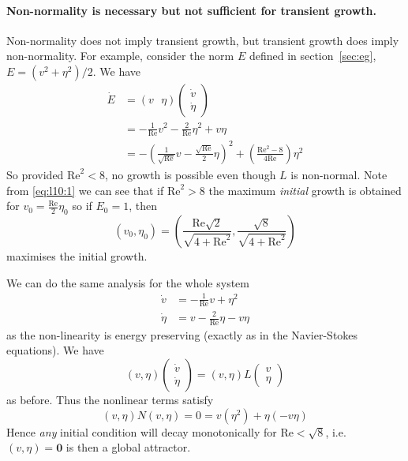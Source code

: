 \documentclass{jknotes}
\newcommand{\ReN}{\text{Re}}
\begin{document}
\paragraph{Non-normality is necessary but not sufficient for transient
growth.}
Non-normality does not imply transient growth, but transient growth does imply
non-normality. For example, consider the norm $E$ defined in
section~\ref{sec:eg}, $E = (v^2 + \eta^2)/2$. We have
\begin{align}
	\dot{E} &= \left(v \,\,\,\, \eta\right) \begin{pmatrix} \dot{v} \\
	\dot{\eta} \end{pmatrix} \\
			&= -\frac{1}{\ReN} v^2 - \frac{2}{\ReN} \eta^2 + v \eta \\
			&= -\left(\frac{1}{\sqrt{\ReN}} v - \frac{\sqrt{\ReN}}{2} \eta
			\right)^2 + \left(\frac{\ReN^2 - 8}{4\ReN}\right) \eta^2
			\label{eq:l10:1}
\end{align}
So provided $\ReN^2 < 8$, no growth is possible even though $L$ is non-normal.
Note from \eqref{eq:l10:1} we can see that if $\ReN^2 > 8$ the maximum
\emph{initial} growth is obtained for $v_0 = \frac{\ReN}{2}\eta_0$ so if $E_0
=1$, then
\begin{equation}
	(v_0, \eta_0) = \left( \frac{\ReN\sqrt{2}}{\sqrt{4+\ReN^2}},
	\frac{\sqrt{8}}{\sqrt{4+\ReN^2}}\right)
\end{equation}
maximises the initial growth.

We can do the same analysis for the whole system
\begin{align}
	\dot{v} &= -\frac{1}{\ReN} v + \eta^2 \\
	\dot{\eta} &= v - \frac{2}{\ReN} \eta - v \eta
\end{align}
as the non-linearity is energy preserving (exactly as in the Navier-Stokes
equations). We have
\begin{equation}
	(v, \eta) \begin{pmatrix} \dot{v} \\ \dot{\eta} \end{pmatrix} 
	= (v, \eta) L \begin{pmatrix} v \\ \eta \end{pmatrix}
\end{equation}
as before. Thus the nonlinear terms satisfy
\begin{equation}
	(v, \eta) N(v, \eta) = 0 = v(\eta^2) + \eta(-v\eta)
\end{equation}
Hence \emph{any} initial condition will decay monotonically for $\ReN <
\sqrt{8}$, i.e. $(v, \eta) = \symbf{0}$ is then a global attractor.
\end{document}
